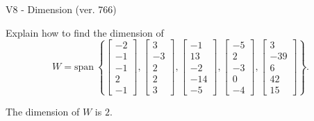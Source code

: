 \begin{exercise}
  \begin{exerciseTitle}V8 - Dimension (ver. 766)\end{exerciseTitle}
  \begin{exerciseStatement}
    Explain how to find the dimension of 
\[W=\mathrm{span}\ \left\{\left[\begin{array}{r}
-2 \\
-1 \\
-1 \\
2 \\
-1
\end{array}\right] , \left[\begin{array}{r}
3 \\
-3 \\
2 \\
2 \\
3
\end{array}\right] , \left[\begin{array}{r}
-1 \\
13 \\
-2 \\
-14 \\
-5
\end{array}\right] , \left[\begin{array}{r}
-5 \\
2 \\
-3 \\
0 \\
-4
\end{array}\right] , \left[\begin{array}{r}
3 \\
-39 \\
6 \\
42 \\
15
\end{array}\right]\right\}.\]



  \end{exerciseStatement}
  \begin{exerciseAnswer}
   The dimension of \(W\) is  \(2\).
  


  \end{exerciseAnswer}
\end{exercise}